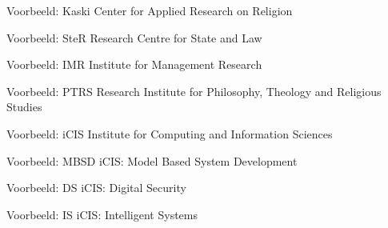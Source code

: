 \documentclass[department=ds, notes={hide notes}, slidesperpage=4, handout, official=true]{beamerruhuisstijl}
\begin{document}
\renewcommand{\dept}{kaski}
\begin{frame}
    \titlepage
\end{frame}
\begin{frame}{Voorbeeld: Kaski}
    Center for Applied Research on Religion
\end{frame}

\renewcommand{\dept}{ster}
\begin{frame}
    \titlepage
\end{frame}
\begin{frame}{Voorbeeld: SteR}
    Research Centre for State and Law
\end{frame}

\renewcommand{\dept}{imr}
\begin{frame}
    \titlepage
\end{frame}
\begin{frame}{Voorbeeld: IMR}
    Institute for Management Research
\end{frame}

\renewcommand{\dept}{ptrs}
\begin{frame}
    \titlepage
\end{frame}
\begin{frame}{Voorbeeld: PTRS}
    Research Institute for Philosophy, Theology and Religious Studies
\end{frame}

\renewcommand{\dept}{icis}
\begin{frame}
    \titlepage
\end{frame}
\begin{frame}{Voorbeeld: iCIS}
    Institute for Computing and Information Sciences
\end{frame}

\renewcommand{\dept}{mbsd}
\begin{frame}
    \titlepage
\end{frame}
\begin{frame}{Voorbeeld: MBSD}
    iCIS: Model Based System Development
\end{frame}

\renewcommand{\dept}{ds}
\begin{frame}
    \titlepage
\end{frame}
\begin{frame}{Voorbeeld: DS}
    iCIS: Digital Security
\end{frame}

\renewcommand{\dept}{is}
\begin{frame}
    \titlepage
\end{frame}
\begin{frame}{Voorbeeld: IS}
    iCIS: Intelligent Systems
\end{frame}
\end{document}
